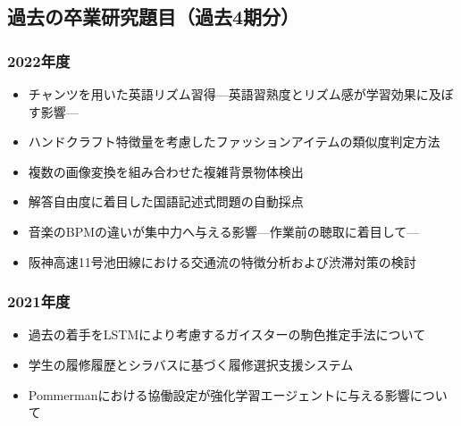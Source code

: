 \documentclass[uplatex,jis2004,a4paper,11pt]{jsarticle}
\begin{document}
\subsection*{過去の卒業研究題目（過去4期分）}
\vspace{-.5cm}
\begin{multicols}{2}
{\fontsize{9pt}{0mm}\selectfont
\subsubsection*{2022年度}
\begin{itemize}
  \item チャンツを用いた英語リズム習得---英語習熟度とリズム感が学習効果に及ぼす影響---
  \item ハンドクラフト特徴量を考慮したファッションアイテムの類似度判定方法
  \item 複数の画像変換を組み合わせた複雑背景物体検出
  \item 解答自由度に着目した国語記述式問題の自動採点
  \item 音楽のBPMの違いが集中力へ与える影響---作業前の聴取に着目して---
  \item 阪神高速11号池田線における交通流の特徴分析および渋滞対策の検討
\end{itemize}
\vspace{-5mm}
\subsubsection*{2021年度}
\begin{itemize}
  \item 過去の着手をLSTMにより考慮するガイスターの駒色推定手法について
  \item 学生の履修履歴とシラバスに基づく履修選択支援システム
  \item Pommermanにおける協働設定が強化学習エージェントに与える影響について
\end{itemize}
\vspace{-5mm}
}
\end{multicols}
\end{document}
